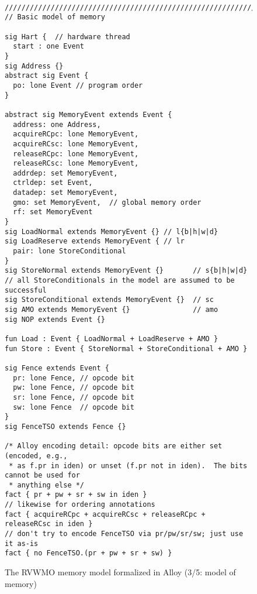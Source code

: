 \begin{figure}[h!]
  {
  \tt\bfseries\centering\footnotesize
  \begin{lstlisting}
////////////////////////////////////////////////////////////////////////////////
// Basic model of memory

sig Hart {  // hardware thread
  start : one Event
}
sig Address {}
abstract sig Event {
  po: lone Event // program order
}

abstract sig MemoryEvent extends Event {
  address: one Address,
  acquireRCpc: lone MemoryEvent,
  acquireRCsc: lone MemoryEvent,
  releaseRCpc: lone MemoryEvent,
  releaseRCsc: lone MemoryEvent,
  addrdep: set MemoryEvent,
  ctrldep: set Event,
  datadep: set MemoryEvent,
  gmo: set MemoryEvent,  // global memory order
  rf: set MemoryEvent
}
sig LoadNormal extends MemoryEvent {} // l{b|h|w|d}
sig LoadReserve extends MemoryEvent { // lr
  pair: lone StoreConditional
}
sig StoreNormal extends MemoryEvent {}       // s{b|h|w|d}
// all StoreConditionals in the model are assumed to be successful
sig StoreConditional extends MemoryEvent {}  // sc
sig AMO extends MemoryEvent {}               // amo
sig NOP extends Event {}

fun Load : Event { LoadNormal + LoadReserve + AMO }
fun Store : Event { StoreNormal + StoreConditional + AMO }

sig Fence extends Event {
  pr: lone Fence, // opcode bit
  pw: lone Fence, // opcode bit
  sr: lone Fence, // opcode bit
  sw: lone Fence  // opcode bit
}
sig FenceTSO extends Fence {}

/* Alloy encoding detail: opcode bits are either set (encoded, e.g.,
 * as f.pr in iden) or unset (f.pr not in iden).  The bits cannot be used for
 * anything else */
fact { pr + pw + sr + sw in iden }
// likewise for ordering annotations
fact { acquireRCpc + acquireRCsc + releaseRCpc + releaseRCsc in iden }
// don't try to encode FenceTSO via pr/pw/sr/sw; just use it as-is
fact { no FenceTSO.(pr + pw + sr + sw) }
\end{lstlisting}}
  \caption{The RVWMO memory model formalized in Alloy (3/5: model of memory)}
  \label{fig:alloy3}
\end{figure}

